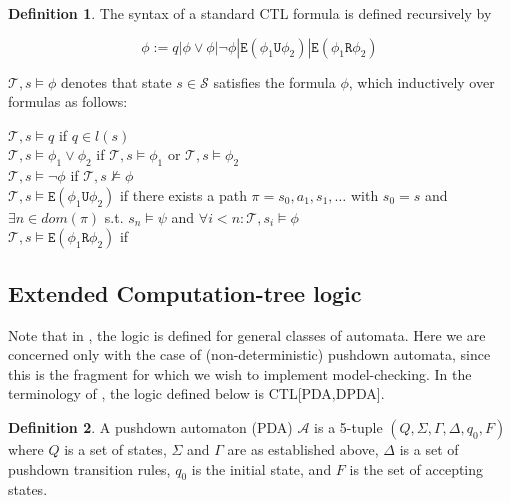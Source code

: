 \documentclass[11pt]{article}
\theoremstyle{definition}
\newtheorem{mydef}{Definition}
\begin{document}
\begin{mydef}
The syntax of a standard CTL formula is defined recursively by

\[ \phi := q | \phi \vee \phi | \neg \phi | \texttt{E}(\phi_1 \texttt{U} \phi_2) | \texttt{E}(\phi_1 \texttt{R} \phi_2) \]

$\mathcal{T}, s \models \phi$ denotes that state $s \in \mathcal{S}$ satisfies
the formula $\phi$, which 
inductively over formulas as follows:

$\mathcal{T}, s \models q$ if $q \in l(s)$ \\
$\mathcal{T}, s \models \phi_1 \vee \phi_2$ if $\mathcal{T}, s \models \phi_1$
or $\mathcal{T}, s \models \phi_2$ \\
$\mathcal{T}, s \models \neg \phi $ if $\mathcal{T}, s \not\models \phi$ \\
$\mathcal{T}, s \models \texttt{E}(\phi_1 \texttt{U} \phi_2) $ if there exists
a path $\pi = s_0,a_1,s_1,\dots$ with $s_0 = s$ and $\exists n \in dom(\pi)$ s.t. $s_n \models \psi$ and $\forall i < n : \mathcal{T}, s_i \models \phi$ \\
$\mathcal{T}, s \models \texttt{E}(\phi_1 \texttt{R} \phi_2) $ if %

\end{mydef}


\subsection{Extended Computation-tree logic}

Note that in \cite{Kreutzer10}, the logic is defined for general classes of
automata. Here we are concerned only with the case of (non-deterministic) %
pushdown automata, since this is the fragment for which we wish to implement
model-checking. In the terminology of \cite{Kreutzer10}, the logic defined
below is CTL[PDA,DPDA].

\begin{mydef}
A pushdown automaton (PDA) $\mathcal{A}$ is a 5-tuple $(Q, \Sigma, \Gamma, \Delta, q_0, F)$ where
$Q$ is a set of states, $\Sigma$ and $\Gamma$ are as established above,
$\Delta$ is a set of pushdown transition rules, $q_0$ is the initial state, and
$F$ is the set of accepting states.
\end{mydef}
\end{document}
